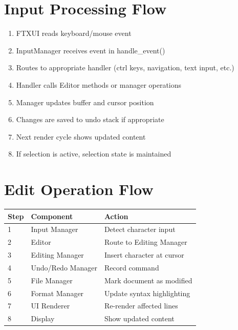 \documentclass[12pt,a4paper,oneside,openany]{report}
\begin{document}
\vspace*{0.5cm}
\section{Input Processing Flow}

\begin{enumerate}
	\item FTXUI reads keyboard/mouse event
	\item InputManager receives event in handle\_event()
	\item Routes to appropriate handler (ctrl keys, navigation, text input, etc.)
	\item Handler calls Editor methods or manager operations
	\item Manager updates buffer and cursor position
	\item Changes are saved to undo stack if appropriate
	\item Next render cycle shows updated content
	\item If selection is active, selection state is maintained
\end{enumerate}

\vspace{2cm}
\section{Edit Operation Flow}

\begin{table}[H]
	\centering
	\begin{tabular}{|l|l|l|}
		\hline
		\textbf{Step} & \textbf{Component} & \textbf{Action}            \\
		\hline
		1             & Input Manager      & Detect character input     \\
		\hline
		2             & Editor             & Route to Editing Manager   \\
		\hline
		3             & Editing Manager    & Insert character at cursor \\
		\hline
		4             & Undo/Redo Manager  & Record command             \\
		\hline
		5             & File Manager       & Mark document as modified  \\
		\hline
		6             & Format Manager     & Update syntax highlighting \\
		\hline
		7             & UI Renderer        & Re-render affected lines   \\
		\hline
		8             & Display            & Show updated content       \\
		\hline
	\end{tabular}
\end{table}
\end{document}

